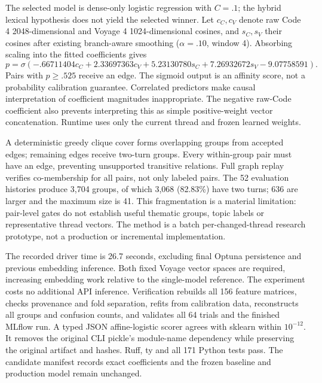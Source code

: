 The selected model is dense-only logistic regression with $C=.1$; the hybrid
lexical hypothesis does not yield the selected winner. Let $c_C,c_V$ denote raw
Code 4 2048-dimensional and Voyage 4 1024-dimensional cosines, and $s_C,s_V$
their cosines after existing branch-aware smoothing ($\alpha=.10$, window 4).
Absorbing scaling into the fitted coefficients gives
\[
p=\sigma(-.66711404c_C+2.33697363c_V+5.23130780s_C+7.26932672s_V-9.07758591).
\]
Pairs with $p\geq .525$ receive an edge. The sigmoid output is an affinity score,
not a probability calibration guarantee. Correlated predictors make causal
interpretation of coefficient magnitudes inappropriate. The negative raw-Code
coefficient also prevents interpreting this as simple positive-weight vector
concatenation. Runtime uses only the current thread and frozen learned weights.

A deterministic greedy clique cover forms overlapping groups from accepted
edges; remaining edges receive two-turn groups. Every within-group pair must
have an edge, preventing unsupported transitive relations. Full graph replay
verifies co-membership for all pairs, not only labeled pairs. The 52 evaluation
histories produce 3,704 groups, of which 3,068 (82.83\%) have two turns; 636 are
larger and the maximum size is 41. This fragmentation is a material limitation:
pair-level gates do not establish useful thematic groups, topic labels or
representative thread vectors. The method is a batch per-changed-thread research
prototype, not a production or incremental implementation.

The recorded driver time is 26.7 seconds, excluding final Optuna persistence and
previous embedding inference. Both fixed Voyage vector spaces are required,
increasing embedding work relative to the single-model reference. The experiment
costs no additional API inference. Verification rebuilds all 156 feature matrices,
checks provenance and fold separation, refits from calibration data, reconstructs
all groups and confusion counts, and validates all 64 trials and the finished
MLflow run. A typed JSON affine-logistic scorer agrees with sklearn within
$10^{-12}$. It removes the original CLI pickle's module-name dependency while
preserving the original artifact and hashes. Ruff, ty and all 171 Python tests
pass. The candidate manifest records exact coefficients and the frozen baseline
and production model remain unchanged.
